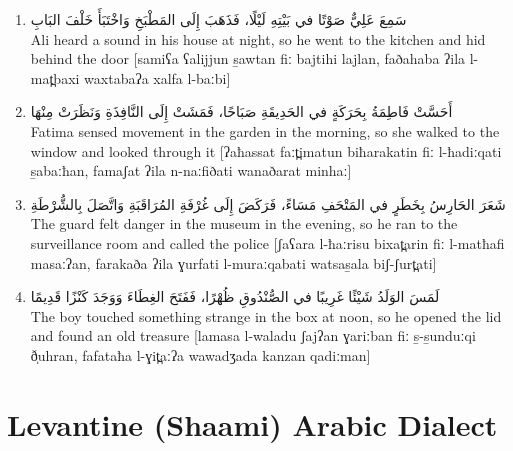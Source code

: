 \documentclass[letter,12pt]{article}
\begin{document}
\begin{enumerate}
\item \textarabic{سَمِعَ عَلِيٌّ صَوْتًا في بَيْتِهِ لَيْلًا، فَذَهَبَ إِلَى المَطْبَخِ وَاخْتَبَأَ خَلْفَ البَابِ}\\
Ali heard a sound in his house at night, so he went to the kitchen and hid behind the door [samiʕa ʕalijjun s̱awtan fiː bajtihi lajlan, faðahaba ʔila l-mat̪baxi waxtabaʔa xalfa l-baːbi]

\item \textarabic{أَحَسَّتْ فَاطِمَةُ بِحَرَكَةٍ في الحَدِيقَةِ صَبَاحًا، فَمَشَتْ إِلَى النَّافِذَةِ وَنَظَرَتْ مِنْهَا}\\
Fatima sensed movement in the garden in the morning, so she walked to the window and looked through it [ʔaħassat faːt̪imatun biħarakatin fiː l-ħadiːqati s̱abaːħan, famaʃat ʔila n-naːfiðati wanaðarat minhaː]

\item \textarabic{شَعَرَ الحَارِسُ بِخَطَرٍ في المَتْحَفِ مَسَاءً، فَرَكَضَ إِلَى غُرْفَةِ المُرَاقَبَةِ وَاتَّصَلَ بِالشُّرْطَةِ}\\
The guard felt danger in the museum in the evening, so he ran to the surveillance room and called the police [ʃaʕara l-ħaːrisu bixat̪arin fiː l-matħafi masaːʔan, farakaða ʔila ɣurfati l-muraːqabati watsas̱ala biʃ-ʃurt̪ati]

\item \textarabic{لَمَسَ الوَلَدُ شَيْئًا غَرِيبًا في الصُّنْدُوقِ ظُهْرًا، فَفَتَحَ الغِطَاءَ وَوَجَدَ كَنْزًا قَدِيمًا}\\
The boy touched something strange in the box at noon, so he opened the lid and found an old treasure [lamasa l-waladu ʃajʔan ɣariːban fiː s̱-s̱unduːqi ð̩uhran, fafataħa l-ɣit̪aːʔa wawadʒada kanzan qadiːman]
\end{enumerate}

\section{Levantine (Shaami) Arabic Dialect}
\end{document}
